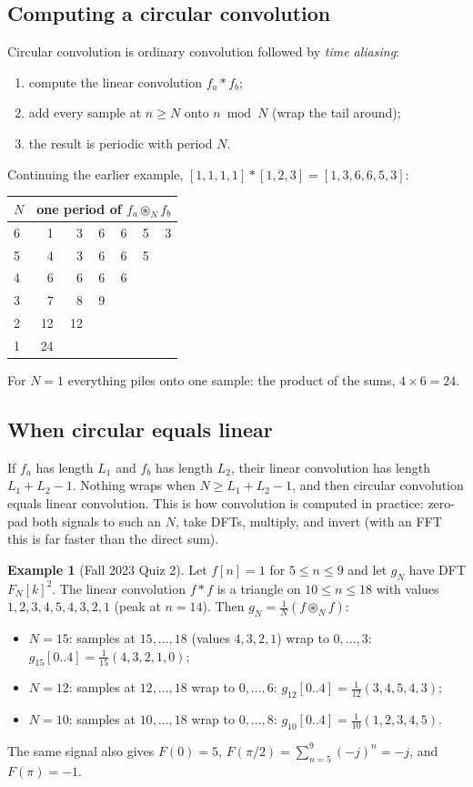 \documentclass[11pt]{article}
\numberwithin{equation}{section}
\theoremstyle{definition}
\newtheorem{example}{Example}[section]
\theoremstyle{remark}
\newcommand{\cconv}{\circledast}
\begin{document}
\subsection{Computing a circular convolution}
Circular convolution is ordinary convolution followed by \emph{time aliasing}:
\begin{enumerate}
\item compute the linear convolution $f_a*f_b$;
\item add every sample at $n\ge N$ onto $n\bmod N$ (wrap the tail around);
\item the result is periodic with period $N$.
\end{enumerate}
Continuing the earlier example, $[1,1,1,1]*[1,2,3]=[1,3,6,6,5,3]$:

\begin{center}
\begin{tabular}{@{}l*{6}{r}@{}}
\toprule
$N$ & \multicolumn{6}{l}{one period of $f_a\cconv_N f_b$}\\
\midrule
6 & 1 & 3 & 6 & 6 & 5 & 3\\
5 & 4 & 3 & 6 & 6 & 5 & \\
4 & 6 & 6 & 6 & 6 & & \\
3 & 7 & 8 & 9 & & & \\
2 & 12 & 12 & & & & \\
1 & 24 & & & & & \\
\bottomrule
\end{tabular}
\end{center}
For $N=1$ everything piles onto one sample: the product of the sums, $4\times6=24$.

\subsection{When circular equals linear}
If $f_a$ has length $L_1$ and $f_b$ has length $L_2$, their linear convolution has length $L_1+L_2-1$.
Nothing wraps when $N\ge L_1+L_2-1$, and then circular convolution equals linear convolution. This is
how convolution is computed in practice: zero-pad both signals to such an $N$, take DFTs, multiply,
and invert (with an FFT this is far faster than the direct sum).

\begin{example}[Fall 2023 Quiz 2]
Let $f[n]=1$ for $5\le n\le9$ and let $g_N$ have DFT $F_N[k]^2$. The linear convolution $f*f$ is a
triangle on $10\le n\le18$ with values $1,2,3,4,5,4,3,2,1$ (peak at $n=14$). Then
$g_N=\frac1N(f\cconv_Nf)$:
\begin{itemize}
\item $N=15$: samples at $15,\dots,18$ (values $4,3,2,1$) wrap to $0,\dots,3$:
$g_{15}[0..4]=\frac1{15}(4,3,2,1,0)$;
\item $N=12$: samples at $12,\dots,18$ wrap to $0,\dots,6$: $g_{12}[0..4]=\frac1{12}(3,4,5,4,3)$;
\item $N=10$: samples at $10,\dots,18$ wrap to $0,\dots,8$: $g_{10}[0..4]=\frac1{10}(1,2,3,4,5)$.
\end{itemize}
The same signal also gives $F(0)=5$, $F(\pi/2)=\sum_{n=5}^{9}(-j)^n=-j$, and $F(\pi)=-1$.
\end{example}
\end{document}
